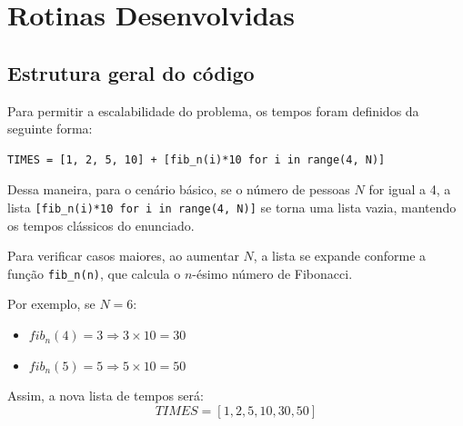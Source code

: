 \documentclass[12pt,a4paper]{article}
\begin{document}
\section{Rotinas Desenvolvidas}

\subsection{Estrutura geral do código}

Para permitir a escalabilidade do problema, os tempos foram definidos da seguinte forma:

\begin{lstlisting}
TIMES = [1, 2, 5, 10] + [fib_n(i)*10 for i in range(4, N)]
\end{lstlisting}

Dessa maneira, para o cenário básico, se o número de pessoas $N$ for igual a 4, a lista
\texttt{[fib\_n(i)*10 for i in range(4, N)]} se torna uma lista vazia, mantendo os tempos clássicos do enunciado.

Para verificar casos maiores, ao aumentar $N$, a lista se expande conforme a função \texttt{fib\_n(n)}, que calcula o $n$-ésimo número de Fibonacci.

Por exemplo, se $N = 6$:
\begin{itemize}
    \item $fib_n(4) = 3 \Rightarrow 3 \times 10 = 30$
    \item $fib_n(5) = 5 \Rightarrow 5 \times 10 = 50$
\end{itemize}

Assim, a nova lista de tempos será:
\[
TIMES = [1, 2, 5, 10, 30, 50]
\]
\end{document}
